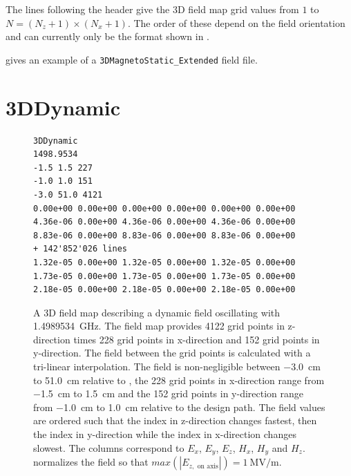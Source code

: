 The lines following the header give the 3D field map grid values from $1$ to $N= (N_{z} + 1) \times (N_{x} + 1)$.
The order of these depend on the field orientation  and can currently only be the
format shown in .

 gives an example of a \texttt{3DMagnetoStatic\_Extended} field file.

\section{3DDynamic}
\label{sec:3DDynamic}
\begin{figure}[h]
  \begin{fmpage}
\begin{verbatim}
3DDynamic
1498.9534
-1.5 1.5 227
-1.0 1.0 151
-3.0 51.0 4121
0.00e+00 0.00e+00 0.00e+00 0.00e+00 0.00e+00 0.00e+00
4.36e-06 0.00e+00 4.36e-06 0.00e+00 4.36e-06 0.00e+00
8.83e-06 0.00e+00 8.83e-06 0.00e+00 8.83e-06 0.00e+00
+ 142'852'026 lines
1.32e-05 0.00e+00 1.32e-05 0.00e+00 1.32e-05 0.00e+00
1.73e-05 0.00e+00 1.73e-05 0.00e+00 1.73e-05 0.00e+00
2.18e-05 0.00e+00 2.18e-05 0.00e+00 2.18e-05 0.00e+00
\end{verbatim}
  \end{fmpage}
  \caption[Example of a 3DDynamic field map]{A 3D field map describing a dynamic field oscillating with \SI{1.4989534}{\giga\hertz}.
    The field map provides 4122 grid points in z-direction times 228 grid points in x-direction and 152 grid points in y-direction.
    The field between the grid points is calculated with a tri-linear interpolation. The field is non-negligible between \SI{-3.0}{\centi\meter}
    to \SI{51.0}{\centi\meter} relative to , the 228 grid points in x-direction range from \SI{-1.5}{\centi\meter} to \SI{1.5}{\centi\meter} and the 152 grid
    points in y-direction range from \SI{-1.0}{\centi\meter} to \SI{1.0}{\centi\meter} relative to the design path. The field values are ordered such that the index in z-direction changes fastest, then the index in y-direction while the index in x-direction changes
    slowest. The columns correspond to $E_x$, $E_y$, $E_z$, $H_x$, $H_y$ and $H_z$. \opalt normalizes the field so that $max(|E_{z,\text{ on axis}}|) = \SI{1}{\mega\volt\per\meter}$.}
  \label{fig:3DDynamic}
\end{figure}

